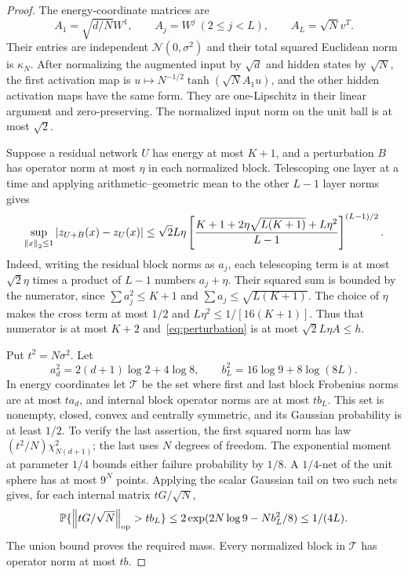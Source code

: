 \begin{proof}
The energy-coordinate matrices are
\[
 A_1=\sqrt{d/N}W^1,\qquad A_j=W^j\ (2\le j<L),\qquad
 A_L=\sqrt N v^T.
\]
Their entries are independent $\mathcal N(0,\sigma^2)$ and their
total squared Euclidean norm is $\kappa_N$.
After normalizing the augmented input by $\sqrt d$ and hidden states
by $\sqrt N$, the first activation map is
$u\mapsto N^{-1/2}\tanh(\sqrt N A_1u)$, and the other hidden
activation maps have the same form. They are one-Lipschitz in their
linear argument and zero-preserving. The normalized input norm on
the unit ball is at most $\sqrt2$.

Suppose a residual network $U$ has energy at most $K+1$, and a
perturbation $B$ has operator norm at most $\eta$ in each normalized
block. Telescoping one layer at a time and applying
arithmetic--geometric mean to the other $L-1$ layer norms gives
\begin{equation}\label{eq:perturbation}
 \sup_{\left\Vert x\right\Vert_2\le1}|z_{U+B}(x)-z_U(x)|
 \le\sqrt2 L\eta
 \left[\frac{K+1+2\eta\sqrt{L(K+1)}+L\eta^2}{L-1}
 \right]^{(L-1)/2}.
\end{equation}
Indeed, writing the residual block norms as $a_j$, each telescoping
term is at most $\sqrt2\eta$ times a product of $L-1$ numbers
$a_j+\eta$. Their squared sum is bounded by the numerator, since
$\sum a_j^2\le K+1$ and $\sum a_j\le\sqrt{L(K+1)}$.
The choice of $\eta$ makes the cross term at most $1/2$ and
$L\eta^2\le1/[16(K+1)]$. Thus that numerator is at most $K+2$
and~\eqref{eq:perturbation} is at most $\sqrt2L\eta A\le h$.

Put $t^2=N\sigma^2$. Let
\[
 a_d^2=2(d+1)\log2+4\log8,\qquad
 b_L^2=16\log9+8\log(8L).
\]
In energy coordinates let $\mathcal T$ be the set where first and
last block Frobenius norms are at most $ta_d$, and internal block
operator norms are at most $tb_L$. This set is nonempty, closed,
convex and centrally symmetric, and its Gaussian probability is
at least $1/2$. To verify the last assertion, the first squared norm
has law $(t^2/N)\chi^2_{N(d+1)}$; the last uses $N$ degrees of
freedom. The exponential moment at parameter $1/4$ bounds either
failure probability by $1/8$. A $1/4$-net of the unit sphere has at
most $9^N$ points. Applying the scalar Gaussian tail on two such
nets gives, for each internal matrix $tG/\sqrt N$,
\[
 \mathbb P\{\left\Vert tG/\sqrt N\right\Vert_{\rm op}>tb_L\}
 \le2\exp(2N\log9-Nb_L^2/8)\le1/(4L).
\]
The union bound proves the required mass. Every normalized block
in $\mathcal T$ has operator norm at most $tb$.


\end{proof}
